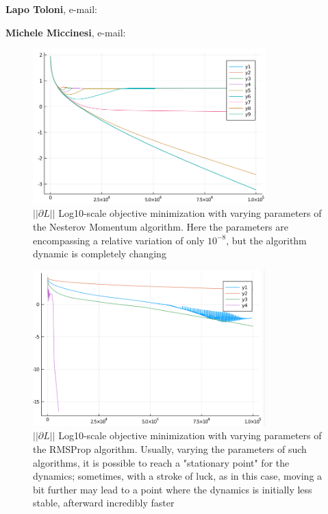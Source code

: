 \documentclass[10pt,twoside,book,a5paper]{ncc}
\begin{document}
\begin{minipage}{\textwidth}


\small
\noindent \textbf{Lapo Toloni}, e-mail: 

\noindent \textbf{Michele Miccinesi}, e-mail: \par
\end{minipage}
\newpage
\begin{figure}[ht]
\centering
\includegraphics[width=0.80\textwidth]{NesterovParameters}
\caption{$||\partial L||$ Log10-scale objective minimization with varying parameters of the Nesterov Momentum algorithm. Here the parameters are encompassing a relative variation of only $10^{-8}$, but the algorithm dynamic is completely changing}
\label{fig:NesterovParameters}
\end{figure}
\begin{figure}[ht]
\centering
\includegraphics[width=0.80\textwidth]{RMSPropParameters}
\caption{$||\partial L||$ Log10-scale objective minimization with varying parameters of the RMSProp algorithm. Usually, varying the parameters of such algorithms, it is possible to reach a "stationary point" for the dynamics; sometimes, with a stroke of luck, as in this case, moving a bit further may lead to a point where the dynamics is initially less stable, afterward incredibly faster}
\label{fig:RMSPropParameters}
\end{figure}
\end{document}
